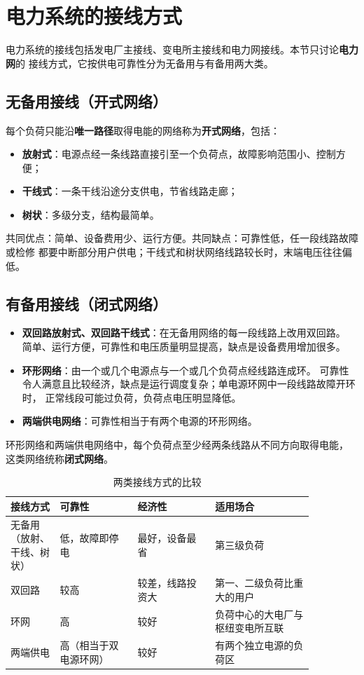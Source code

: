 \section{电力系统的接线方式}

电力系统的接线包括发电厂主接线、变电所主接线和电力网接线。本节只讨论\textbf{电力网}的
接线方式，它按供电可靠性分为无备用与有备用两大类。

\subsection{无备用接线（开式网络）}

每个负荷只能沿\textbf{唯一路径}取得电能的网络称为\textbf{开式网络}，包括：
\begin{itemize}
  \item \textbf{放射式}：电源点经一条线路直接引至一个负荷点，故障影响范围小、控制方便；
  \item \textbf{干线式}：一条干线沿途分支供电，节省线路走廊；
  \item \textbf{树状}：多级分支，结构最简单。
\end{itemize}
共同优点：简单、设备费用少、运行方便。共同缺点：可靠性低，任一段线路故障或检修
都要中断部分用户供电；干线式和树状网络线路较长时，末端电压往往偏低。

\subsection{有备用接线（闭式网络）}

\begin{itemize}
  \item \textbf{双回路放射式、双回路干线式}：在无备用网络的每一段线路上改用双回路。
        简单、运行方便，可靠性和电压质量明显提高，缺点是设备费用增加很多。
  \item \textbf{环形网络}：由一个或几个电源点与一个或几个负荷点经线路连成环。
        可靠性令人满意且比较经济，缺点是运行调度复杂；单电源环网中一段线路故障开环时，
        正常线段可能过负荷，负荷点电压明显降低。
  \item \textbf{两端供电网络}：可靠性相当于有两个电源的环形网络。
\end{itemize}

环形网络和两端供电网络中，每个负荷点至少经两条线路从不同方向取得电能，
这类网络统称\textbf{闭式网络}。

\begin{table}[htbp]
  \centering
  \caption{两类接线方式的比较}
  \small
  \begin{tabular}{@{}p{0.14\linewidth}p{0.22\linewidth}p{0.22\linewidth}p{0.28\linewidth}@{}}
    \toprule
    接线方式 & 可靠性 & 经济性 & 适用场合 \\
    \midrule
    无备用（放射、干线、树状） & 低，故障即停电 & 最好，设备最省 & 第三级负荷 \\
    双回路 & 较高 & 较差，线路投资大 & 第一、二级负荷比重大的用户 \\
    环网 & 高 & 较好 & 负荷中心的大电厂与枢纽变电所互联 \\
    两端供电 & 高（相当于双电源环网） & 较好 & 有两个独立电源的负荷区 \\
    \bottomrule
  \end{tabular}
\end{table}

